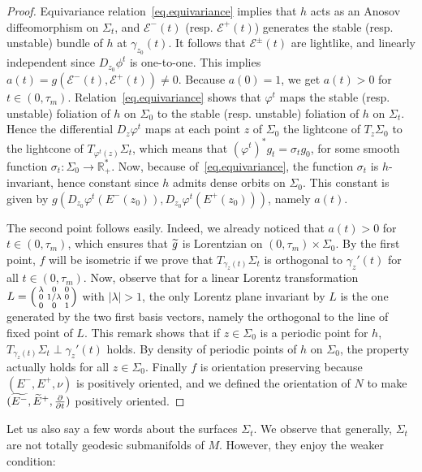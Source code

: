 \documentclass[11pt]{article}
\theoremstyle{definition}
\numberwithin{equation}{section}
\numberwithin{figure}{section}
\numberwithin{table}{section}
\newcommand{\ddt}{\frac{\partial}{\partial t}}
\newcommand*\RR{\mathbb{R}}
\let\oldtilde\tilde
\renewcommand*\tilde[1]{\mathchoice{\widetilde{#1}}{\widetilde{#1}}{\widetilde{#1}}{\oldtilde{#1}}}
\newenvironment{smallpmatrix}{\left(\begin{smallmatrix}}{\end{smallmatrix}\right)}
\newcommand*{\sfrac}[2]{#1/#2}
\begin{document}
\begin{proof}
Equivariance relation~\eqref{eq.equivariance} implies that $h$ acts as an Anosov diffeomorphism on $\Sigma_t$, and $\mathcal{E}^{-}(t)$ (resp. $\mathcal{E}^{+}(t)$) generates the stable (resp. unstable) bundle of $h$ at $\gamma_{z_0}(t)$. It follows that $\mathcal{E}^{\pm}(t)$ are lightlike, and linearly independent since $D_{z_0}\phi^t$ is one-to-one. This implies $a(t)=g(\mathcal{E}^{-}(t),\mathcal{E}^{+}(t))\not = 0$. Because $a(0)=1$, we get $a(t)>0$ for $t \in (0,\tau_m)$. Relation~\eqref{eq.equivariance} shows that $\varphi^t$ maps the stable (resp. unstable) foliation of $h$ on ${\Sigma}_0$ to the stable (resp. unstable) foliation of $h$ on ${\Sigma}_t$. Hence the differential $D_z\varphi^t$ maps at each point $z$ of ${\Sigma}_0$ the lightcone of ${T}_z{\Sigma}_0$ to the lightcone of ${T}_{\varphi^t(z)}{\Sigma}_t$, which means that $(\varphi^t)^*g_t=\sigma_tg_0$, for some smooth function $\sigma_t : {\Sigma}_0 \to \RR_+^*$. Now, because of~\eqref{eq.equivariance}, the function $\sigma_t$ is $h$-invariant, hence constant since $h$ admits dense orbits on ${\Sigma}_0$. This constant is given by $g(D_{z_0}\varphi^t(E^-(z_0)), D_{z_0}\varphi^t(E^+(z_0)))$, namely ${a}(t)$.


The second point follows easily. Indeed, we already noticed that $a(t)>0$ for $t \in (0,\tau_m)$, which ensures that $\tilde{g}$ is Lorentzian on $(0,\tau_m) \times \Sigma_0$. By the first point, $f$ will be isometric if we prove that $T_{\gamma_z(t)}\Sigma_t$ is orthogonal to $\gamma_z'(t)$ for all $t \in (0,\tau_m)$. Now, observe that for a linear Lorentz transformation $L=\begin{smallpmatrix} \lambda&0&0\\ 0& \sfrac{1}{\lambda}&0\\ 0&0&1\end{smallpmatrix}$ with $|\lambda|>1$, the only Lorentz plane invariant by $L$ is the one generated by the two first basis vectors, namely the orthogonal to the line of fixed point of $L$. This remark shows that if $z \in \Sigma_0$ is a periodic point for $h$, $T_{\gamma_z(t)}\Sigma_t \perp \gamma_z'(t)$ holds. By density of periodic points of $h$ on ${\Sigma}_0$, the property actually holds for all $z \in {\Sigma}_0$. Finally $f$ is orientation preserving because $(E^-,E^+,\nu)$ is positively oriented, and we defined the orientation of $N$ to make $(\tilde{E^-},\tilde{E}^+,\ddt)$ positively oriented.
\end{proof}

Let us also say a few words about the surfaces $\Sigma_t$. We observe that generally, $\Sigma_t$ are not totally geodesic submanifolds of $M$. However, they enjoy the weaker condition:
\end{document}
